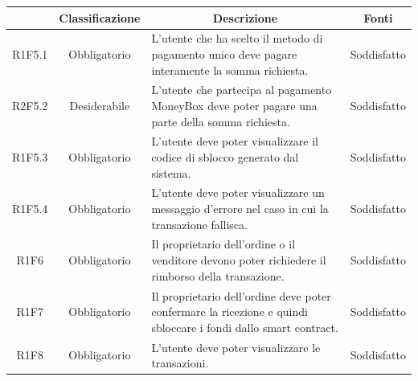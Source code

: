 \begin{table}[H]
    \centering
    \renewcommand{\arraystretch}{1.8}
    \begin{tabular}{c | c | p{6cm} | c}
        \rowcolor[HTML]{125E28}
        \multicolumn{1}{c}{\color[HTML]{FFFFFF} \textbf{Codice}}          &
        \multicolumn{1}{c}{\color[HTML]{FFFFFF} \textbf{Classificazione}} &
        \multicolumn{1}{c}{\color[HTML]{FFFFFF} \textbf{Descrizione}}     &
        \multicolumn{1}{c}{\color[HTML]{FFFFFF} \textbf{Fonti}}                                                                                                                                                                                          \\
        \hline
        R1F5.1                                                            & Obbligatorio & L'utente che ha scelto il metodo di pagamento unico deve pagare interamente la somma richiesta.                       & Soddisfatto      \\
        R2F5.2                                                            & Desiderabile & L'utente che partecipa al pagamento MoneyBox\glo{} deve poter pagare una parte della somma richiesta.                 & Soddisfatto      \\
        R1F5.3                                                            & Obbligatorio & L'utente deve poter visualizzare il codice di sblocco generato dal sistema.                                           & Soddisfatto                                 \\
        R1F5.4                                                            & Obbligatorio & L'utente deve poter visualizzare un messaggio d'errore nel caso in cui la transazione fallisca.                       & Soddisfatto                               \\
        R1F6                                                              & Obbligatorio & Il proprietario dell'ordine o il venditore devono poter richiedere il rimborso della transazione.                     & Soddisfatto   \\
        R1F7                                                              & Obbligatorio & Il proprietario dell'ordine deve poter confermare la ricezione e quindi sbloccare i fondi dallo smart contract\glo{}. & Soddisfatto   \\
        R1F8                                                              & Obbligatorio & L'utente deve poter visualizzare le transazioni.                                                                      & Soddisfatto   \\

\end{tabular}
\end{table}
